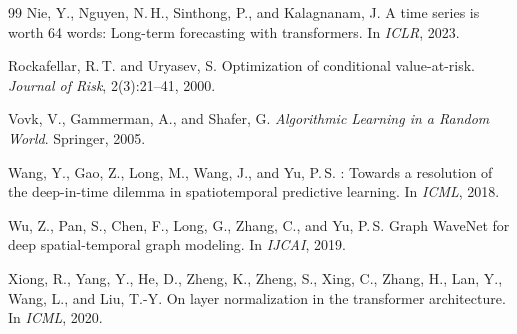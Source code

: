 \documentclass[11pt,a4paper]{article}
\begin{document}
\begin{thebibliography}{99}
  Nie, Y., Nguyen, N.\,H., Sinthong, P., and Kalagnanam, J.
  \newblock A time series is worth 64 words: Long-term forecasting with transformers.
  \newblock In \emph{ICLR}, 2023.

  Rockafellar, R.\,T. and Uryasev, S.
  \newblock Optimization of conditional value-at-risk.
  \newblock \emph{Journal of Risk}, 2(3):21--41, 2000.

  Vovk, V., Gammerman, A., and Shafer, G.
  \newblock \emph{Algorithmic Learning in a Random World}.
  \newblock Springer, 2005.

  Wang, Y., Gao, Z., Long, M., Wang, J., and Yu, P.\,S.
  : Towards a resolution of the deep-in-time dilemma in spatiotemporal predictive learning.
  \newblock In \emph{ICML}, 2018.

  Wu, Z., Pan, S., Chen, F., Long, G., Zhang, C., and Yu, P.\,S.
  \newblock Graph {WaveNet} for deep spatial-temporal graph modeling.
  \newblock In \emph{IJCAI}, 2019.

  Xiong, R., Yang, Y., He, D., Zheng, K., Zheng, S., Xing, C., Zhang, H., Lan, Y., Wang, L., and Liu, T.-Y.
  \newblock On layer normalization in the transformer architecture.
  \newblock In \emph{ICML}, 2020.

\end{thebibliography}
\end{document}
